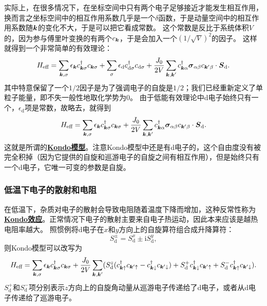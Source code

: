 \documentclass[hyperref, UTF8, a4paper]{ctexart}
\newcommand*{\ii}{\mathrm{i}}
\newcommand*{\concept}[1]{\underline{\textbf{#1}}}
\begin{document}
实际上，在很多情况下，在坐标空间中只有两个电子足够接近才能发生相互作用，换而言之坐标空间中的相互作用系数几乎是一个$\delta$函数，于是动量空间中的相互作用系数随$\vb*{k}$的变化不大，于是可以把它看成常数。
这个常数是反比于系统体积$V$的，因为参与傅里叶变换的有两个${c}_{\vb*{k}}$，于是会加入一个$(1/\sqrt{V})^2$的因子。
这样就得到一个非常简单的有效理论：
\[
    {H}_\text{eff} = \sum_{\vb*{k}, \sigma} \epsilon_{\vb*{k}} {c}_{\vb*{k}\sigma}^\dagger {c}_{\vb*{k} \sigma} + \sum_\sigma \epsilon_\text{d} {c}_{\text{d}\sigma}^\dagger {c}_{\text{d} \sigma} + \frac{J_0}{2V} \sum_{\vb*{k}, \vb*{k}'} {c}^\dagger_{\vb*{k} \alpha} \vb*{\sigma}_{\alpha \beta} {c}_{\vb*{k}' \beta} \cdot {\vb*{S}}_\text{d}.
\]
其中特意保留了一个$1/2$因子是为了强调电子的自旋是$1/2$；我们已经重新定义了单粒子能量，即不失一般性地取化学势为$0$。%
由于低能有效理论中d电子始终只有一个，$\epsilon_\text{d}$项是常数，故略去，就得到
\begin{equation}
    {H}_\text{eff} = \sum_{\vb*{k}, \sigma} \epsilon_{\vb*{k}} {c}_{\vb*{k}\sigma}^\dagger {c}_{\vb*{k} \sigma} + \frac{J_0}{2V} \sum_{\vb*{k}, \vb*{k}'} {c}^\dagger_{\vb*{k} \alpha} \vb*{\sigma}_{\alpha \beta} {c}_{\vb*{k}' \beta} \cdot {\vb*{S}_\text{d}}.
\end{equation}
这就是所谓的\concept{Kondo模型}。注意Kondo模型中还是有d电子的，这个自由度没有被完全积掉（因为它提供的自旋和巡游电子的自旋之间有相互作用），但是始终只有一个d电子，它唯一可变的参数是自旋。

\subsubsection{低温下电子的散射和电阻}

在低温下，杂质对电子的散射会导致电阻随着温度下降而增加，这种反常性称为\concept{Kondo效应}。正常情况下电子的散射主要来自电子热运动，因此本来应该是越热电阻率越大。
照惯例将d电子在$x$和$y$方向上的自旋算符组合成升降算符：
\begin{equation}
    {S}_\text{d}^{\pm} = {S}_\text{d}^x \pm \ii {S}_\text{d}^y,
\end{equation}
则Kondo模型可以改写为
\begin{equation}
    {H}_\text{eff} = \sum_{\vb*{k}, \sigma} \epsilon_{\vb*{k}} {c}^\dagger_{\vb*{k} \sigma} {c}_{\vb*{k} \sigma} + \frac{J_0}{2V} \sum_{\vb*{k}, \vb*{k}'} (
        {S}_\text{d}^z ({c}^\dagger_{\vb*{k} \uparrow} {c}_{\vb*{k}' \uparrow} - {c}^\dagger_{\vb*{k} \downarrow} {c}_{\vb*{k}' \downarrow})
        + {S}^+_\text{d} {c}^\dagger_{\vb*{k} \downarrow} {c}_{\vb*{k}' \uparrow}
        + {S}^-_\text{d} {c}^\dagger_{\vb*{k} \uparrow} {c}_{\vb*{k}' \downarrow}
    ).
    \label{eq:kondo-spin-up-down}
\end{equation}
${S}^+_\text{d}$和${S}^-_\text{d}$项分别表示$z$方向上的自旋角动量从巡游电子传递给了d电子，或者从d电子传递给了巡游电子。
\end{document}
